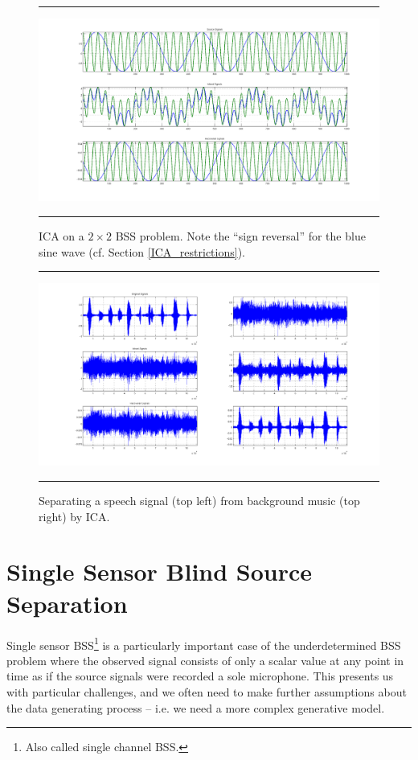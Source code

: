 \documentclass[11pt, oneside, a4paper]{report}
\begin{document}
\begin{figure}\label{ica_fig1}
  \centering
  \hrule
  \includegraphics[width = .9\textwidth]{Figures/ica_simple}
  \hrule
  \caption{ICA on a $2\times 2$ BSS problem. Note the ``sign reversal'' for the 
    blue sine wave (cf. Section \ref{ICA_restrictions}).}
\end{figure}

\begin{figure}\label{ica_fig2}
  \centering
  \hrule
  \includegraphics[width = .9\textwidth]{Figures/ica_music_speech}
  \hrule
  \caption{Separating a speech signal (top left) from background music (top right) by ICA. }
\end{figure}



\chapter{Single Sensor Blind Source Separation}\label{ssbss_chap}

Single sensor BSS\footnote{Also called single channel BSS.} is a
particularly important case of the underdetermined BSS problem where the observed
signal consists of only a scalar value at any point in time as if the
source signals were recorded a sole microphone. This presents us with
particular challenges, and we often need to make further assumptions
about the data generating process -- i.e. we need a more complex
generative model.
\end{document}
